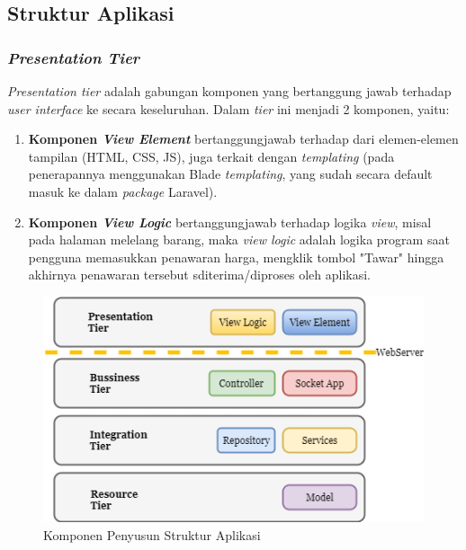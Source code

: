 
\subsection{Struktur Aplikasi}
\label{software-structure}

	
	\subsubsection{\textit{Presentation Tier}}
		\textit{Presentation tier} adalah gabungan komponen yang bertanggung jawab terhadap \textit{user interface} ke secara keseluruhan. Dalam \textit{tier} ini  menjadi 2 komponen, yaitu:
		\begin{enumerate}
			\item \textbf{Komponen \textit{View Element}} bertanggungjawab terhadap dari elemen-elemen tampilan (HTML, CSS, JS), juga terkait dengan \textit{templating} (pada penerapannya menggunakan Blade \textit{templating}, yang sudah secara default masuk ke dalam \textit{package} Laravel).
			\item \textbf{Komponen \textit{View Logic}} bertanggungjawab terhadap logika \textit{view}, misal pada halaman melelang barang, maka \textit{view logic} adalah logika program saat pengguna memasukkan penawaran harga, mengklik tombol "Tawar" hingga akhirnya penawaran tersebut sditerima/diproses oleh aplikasi.
		\end{enumerate}
		
		
		\begin{figure}[h]
			\centering
			\includegraphics[width=.8\textwidth]{images/bab3/apl/main-apl.png}
			\caption{Komponen Penyusun Struktur Aplikasi}
			\label{software-structure-img}
		\end{figure}
		
